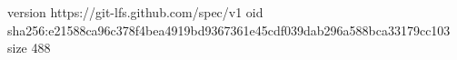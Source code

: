 version https://git-lfs.github.com/spec/v1
oid sha256:e21588ca96c378f4bea4919bd9367361e45cdf039dab296a588bca33179cc103
size 488
